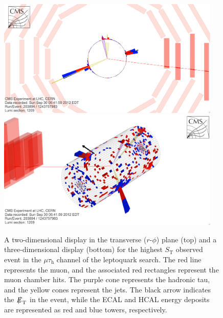\documentclass[12pt]{thesis}  %
\newcommand{\tauh}{\ensuremath{\tau_{\text{h}}}\xspace}
\newcommand{\mutau}{\ensuremath{\mu\tauh}\xspace}
\def\eslash{\ensuremath{{\hbox{$E$\kern-0.6em\lower-.05ex\hbox{/}\kern0.10em}}}}
\def\met{\mbox{$\eslash_\text{T}$}\xspace} %
\def\ST{\ensuremath{S_{\text{T}}}\xspace}
\begin{document}
\begin{figure}[hbtp]
\begin{center}
\includegraphics[width=0.95\textwidth]{figures/eventdisplays/LQ_evt1_rphi.png}
\includegraphics[width=0.95\textwidth]{figures/eventdisplays/LQ_evt1_3D.png}
\caption{A two-dimensional display in the transverse ($r$-$\phi$) plane (top) and a three-dimensional display (bottom) for the highest \ST observed event in the \mutau channel of the leptoquark search. The red line represents the muon, and the associated red rectangles represent the muon chamber hits. The purple cone represents the hadronic tau, and the yellow cones represent the jets. The black arrow indicates the \met in the event, while the ECAL and HCAL energy deposits are represented as red and blue towers, respectively. }
\label{fig:lq-evt1}
\end{center}
\end{figure}
\end{document}

